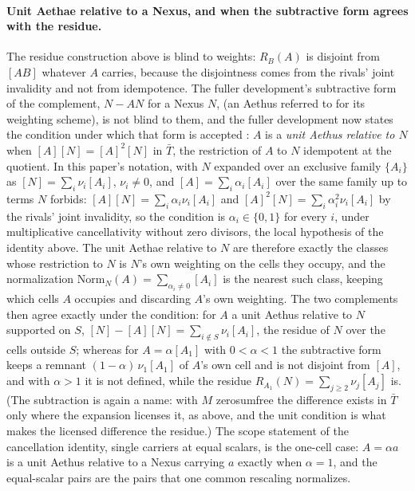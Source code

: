 \paragraph{Unit Aethae relative to a Nexus, and when the subtractive form agrees with the residue.}\label{par:unit-aethus} The residue construction above is blind to weights: $R_B(A)$ is disjoint from $[AB]$ whatever $A$ carries, because the disjointness comes from the rivals' joint invalidity and not from idempotence. The fuller development's subtractive form of the complement, $N - AN$ for a Nexus $N$, (an Aethus referred to for its weighting scheme), is not blind to them, and the fuller development now states the condition under which that form is accepted \cite{Aethus}: $A$ is a \emph{unit Aethus relative to $N$} when $[A][N] = [A]^{2}[N]$ in $\bar{T}$, the restriction of $A$ to $N$ idempotent at the quotient. In this paper's notation, with $N$ expanded over an exclusive family $\{A_i\}$ as $[N] = \sum_i \nu_i [A_i]$, $\nu_i \neq 0$, and $[A] = \sum_i \alpha_i [A_i]$ over the same family up to terms $N$ forbids: $[A][N] = \sum_i \alpha_i \nu_i [A_i]$ and $[A]^{2}[N] = \sum_i \alpha_i^{2} \nu_i [A_i]$ by the rivals' joint invalidity, so the condition is $\alpha_i \in \{0, 1\}$ for every $i$, under multiplicative cancellativity without zero divisors, the local hypothesis of the identity above. The unit Aethae relative to $N$ are therefore exactly the classes whose restriction to $N$ is $N$'s own weighting on the cells they occupy, and the normalization $\mathrm{Norm}_N(A) = \sum_{\alpha_i \neq 0} [A_i]$ is the nearest such class, keeping which cells $A$ occupies and discarding $A$'s own weighting. The two complements then agree exactly under the condition: for $A$ a unit Aethus relative to $N$ supported on $S$, $[N] - [A][N] = \sum_{i \notin S} \nu_i [A_i]$, the residue of $N$ over the cells outside $S$; whereas for $A = \alpha [A_1]$ with $0 < \alpha < 1$ the subtractive form keeps a remnant $(1 - \alpha)\,\nu_1 [A_1]$ of $A$'s own cell and is not disjoint from $[A]$, and with $\alpha > 1$ it is not defined, while the residue $R_{A_1}(N) = \sum_{j \geq 2} \nu_j [A_j]$ is. (The subtraction is again a name: with $M$ zerosumfree the difference exists in $\bar{T}$ only where the expansion licenses it, as above, and the unit condition is what makes the licensed difference the residue.) The scope statement of the cancellation identity, single carriers at equal scalars, is the one-cell case: $A = \alpha a$ is a unit Aethus relative to a Nexus carrying $a$ exactly when $\alpha = 1$, and the equal-scalar pairs are the pairs that one common rescaling normalizes.
